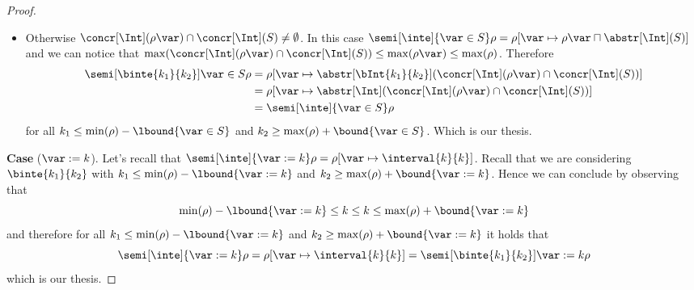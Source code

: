 \begin{proof}
\begin{itemize}
  \item Otherwise
    \({\concr[\Int](\rho\var) \cap \concr[\Int](S) \neq
      \emptyset}\). In this case
    \({\semi[\inte]{\var \in S}\rho = \rho[\var \mapsto \rho\var
      \sqcap \abstr[\Int](S)]}\) and we can notice that
    \(\max(\concr[\Int](\rho\var) \cap \concr[\Int](S)) \leq
    \max(\rho\var) \leq \max(\rho)\). Therefore
    \begin{align*}
      \semi[\binte{k_1}{k_2}]{\var \in S}\rho & = \rho[\var \mapsto \abstr[\bInt{k_1}{k_2}](\concr[\Int](\rho\var) \cap \concr[\Int](S))] \\
                                              & = \rho[\var \mapsto \abstr[\Int](\concr[\Int](\rho\var) \cap \concr[\Int](S))] \\
                                              & = \semi[\inte]{\var\in S}\rho
    \end{align*}
    for all \(k_1 \leq \min(\rho) - \lbound{\var \in S}\) and
    \(k_2 \geq \max(\rho) + \bound{\var\in S}\). Which is our thesis.
  \end{itemize}

  \medskip
  
  \noindent
  \textbf{Case} (\(\var := k\)).
  Let's recall that
  \({\semi[\inte]{\var := k}\rho = \rho[\var \mapsto \interval{k}{k}
    ]}\). Recall that we are considering \(\binte{k_1}{k_2}\) with
  \(k_1 \leq \min(\rho) - \lbound{\var := k}\) and
  \(k_2 \geq \max(\rho) + \bound{\var := k}\). Hence we can conclude by
  observing that
  \begin{equation*}
    \min(\rho) - \lbound{\var := k} \leq k \leq k \leq \max(\rho) + \bound{\var := k}
  \end{equation*}
  and therefore for all \(k_1 \leq \min(\rho) - \lbound{\var:=k}\) and
  \(k_2 \geq \max(\rho) + \bound{\var := k}\) it holds that
  \begin{equation*}
    \semi[\inte]{\var := k}\rho = \rho[\var \mapsto \interval{k}{k}] = \semi[\binte{k_1}{k_2}]{\var := k}\rho
  \end{equation*}
  which is our thesis.

  \medskip
  

\end{proof}
